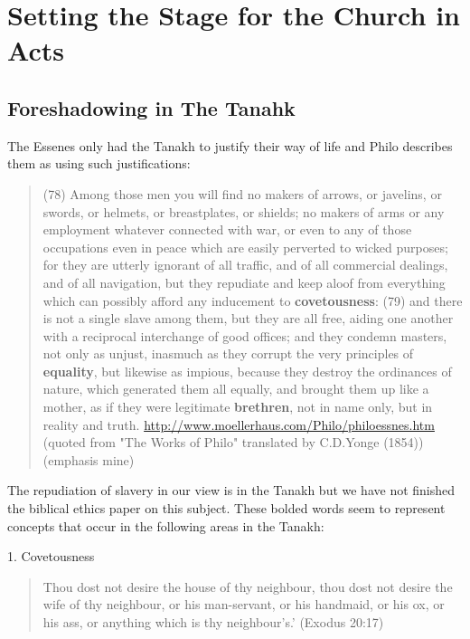 \documentclass[11pt]{article}
\begin{document}
\section{Setting the Stage for the Church in Acts}

\subsection{Foreshadowing in The Tanahk} \label{foreshadowing in the tanahk}
The Essenes only had the Tanakh to justify their way of life and Philo describes them as using such justifications:
\begin{quote}
(78) Among those men you will find no makers of arrows, or javelins, or swords, or helmets, or breastplates, or shields; no makers of arms or any employment whatever connected with war, or even to any of those occupations even in peace which are easily perverted to wicked purposes; for they are utterly ignorant of all traffic, and of all commercial dealings, and of all navigation, but they repudiate and keep aloof from everything which can possibly afford any inducement to \textbf{covetousness}: (79) and there is not a single slave among them, but they are all free, aiding one another with a reciprocal interchange of good offices; and they condemn masters, not only as unjust, inasmuch as they corrupt the very principles of \textbf{equality}, but likewise as impious, because they destroy the ordinances of nature, which generated them all equally, and brought them up like a mother, as if they were legitimate \textbf{brethren}, not in name only, but in reality and truth.  \url{http://www.moellerhaus.com/Philo/philoessnes.htm} (quoted from "The Works of Philo" translated by C.D.Yonge (1854)) (emphasis mine)
\end{quote}
The repudiation of slavery in our view is in the Tanakh but we have not finished the biblical ethics paper on this subject. These bolded words seem to represent concepts that occur in the following areas in the Tanakh: \newline

1. Covetousness
\begin{quote}
Thou dost not desire the house of thy neighbour, thou dost not desire the wife of thy neighbour, or his man-servant, or his handmaid, or his ox, or his ass, or anything which is thy neighbour's.' (Exodus 20:17)
\end{quote}
\end{document}
